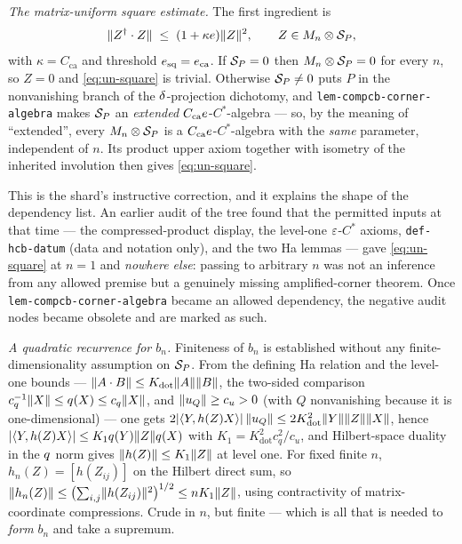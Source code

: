 \emph{The matrix-uniform square estimate.} The first ingredient is
\begin{equation}\label{eq:un-square}
  \lVert Z^{\dagger}\mathbin{\cdot} Z\rVert\;\le\;(1+\kappa e)\lVert Z\rVert^{2},
  \qquad Z\in M_{n}\otimes \mathcal S_{P},
\end{equation}
with $\kappa=C_{\mathrm{ca}}$ and threshold $e_{\mathrm{sq}}=e_{\mathrm{ca}}$. If
$\mathcal S_{P}=0$ then $M_{n}\otimes \mathcal S_{P}=0$ for every $n$, so $Z=0$ and
\eqref{eq:un-square} is trivial. Otherwise $\mathcal S_{P}\ne0$ puts $P$ in the nonvanishing
branch of the $\delta$-projection dichotomy, and
\texttt{lem-compcb-corner-algebra} makes $\mathcal S_{P}$ an \emph{extended}
$C_{\mathrm{ca}}e$-$C^*$-algebra --- so, by the meaning of ``extended'', every
$M_{n}\otimes \mathcal S_{P}$ is a $C_{\mathrm{ca}}e$-$C^*$-algebra with the \emph{same}
parameter, independent of $n$. Its product upper axiom together with isometry of the
inherited involution then gives \eqref{eq:un-square}.

This is the shard's instructive correction, and it explains the shape of the dependency
list. An earlier audit of the tree found that the permitted inputs at that time --- the
compressed-product display, the level-one $\varepsilon$-$C^*$ axioms,
\texttt{def-hcb-datum} (data and notation only), and the two Ha lemmas --- gave
\eqref{eq:un-square} at $n=1$ and \emph{nowhere else}: passing to arbitrary $n$ was not an
inference from any allowed premise but a genuinely missing amplified-corner theorem. Once
\texttt{lem-compcb-corner-algebra} became an allowed dependency, the negative audit nodes
became obsolete and are marked as such.

\emph{A quadratic recurrence for $b_n$.} Finiteness of $b_n$ is established without any
finite-dimensionality assumption on $\mathcal S_{P}$. From the defining Ha relation and the
level-one bounds --- $\lVert A\mathbin{\cdot} B\rVert\le K_{\mathrm{dot}}\lVert A\rVert\lVert B\rVert$, the two-sided
comparison $c_q^{-1}\lVert X\rVert\le q_{}(X)\le c_q\lVert X\rVert$, and $\lVert u_{Q}\rVert\ge c_u>0$
(with $Q$ nonvanishing because it is one-dimensional) --- one gets
$2\lvert\langle Y,h(Z)X\rangle\rvert\,\lVert u_{Q}\rVert\le2K_{\mathrm{dot}}^{2}\lVert Y\rVert\lVert Z\rVert\lVert X\rVert$,
hence $\lvert\langle Y,h(Z)X\rangle\rvert\le K_1q_{}(Y)\lVert Z\rVert q_{}(X)$ with
$K_1=K_{\mathrm{dot}}^{2}c_q^{2}/c_u$, and Hilbert-space duality in the $q_{}$ norm
gives $\lVert h(Z)\rVert\le K_1\lVert Z\rVert$ at level one. For fixed finite $n$, $h_n(Z)=[h(Z_{ij})]$
on the Hilbert direct sum, so
$\lVert h_n(Z)\rVert\le\bigl(\sum_{i,j}\lVert h(Z_{ij})\rVert^{2}\bigr)^{1/2}\le nK_1\lVert Z\rVert$, using
contractivity of matrix-coordinate compressions. Crude in $n$, but finite --- which is all
that is needed to \emph{form} $b_n$ and take a supremum.

